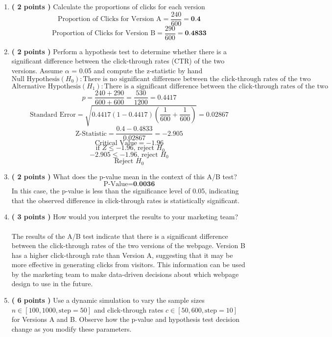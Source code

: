 \documentclass[a3paper,12pt]{extarticle} %
\begin{document}
    \begin{enumerate}
        \item \textbf{( 2 points )} Calculate the proportions of clicks for each version 
        \[
        \text{Proportion of Clicks for Version A} = \frac{240}{600} = \textbf{0.4}
        \]
        \[
        \text{Proportion of Clicks for Version B} = \frac{290}{600} = \textbf{0.4833}
        \]
        \item \textbf{( 2 points )} Perform a hypothesis test to determine whether there is a significant difference between the click-through rates (CTR) of the two versions. Assume \(\alpha\) = 0.05 and compute the z-statistic
        by hand
        \[
        \text{Null Hypothesis} (H_0): \text{There is no significant difference between the click-through rates of the two versions}
        \]
        \[
        \text{Alternative Hypothesis} (H_1): \text{There is a significant difference between the click-through rates of the two versions}
        \]
        \[
        p = \frac{240 + 290}{600 + 600} = \frac{530}{1200} = 0.4417
        \]
        \[
        \text{Standard Error} = \sqrt{0.4417(1-0.4417)(\frac{1}{600} + \frac{1}{600})} = 0.02867
        \]
        \[
        \text{Z-Statistic} = \frac{0.4 - 0.4833}{0.02867} = -2.905
        \]
        \[
        \text{Critical Value} = -1.96
        \]
        \[
        \text{ if } Z \leq -1.96 \text{, reject } H_0
        \]
        \[
         -2.905 \leq -1.96 \text{, reject } H_0
        \]
        \[
        \text{Reject } H_0
        \]
        \item \textbf{( 2 points )} What does the p-value mean in the context of this A/B test?
        \[
        \text{P-Value} = \textbf{0.0036}
        \]
        In this case, the p-value is less than the significance level of 0.05, indicating that the observed difference in click-through rates is statistically significant.
        \item \textbf{( 3 points )} How would you interpret the results to your marketing team?
        \\\\ The results of the A/B test indicate that there is a significant difference between the click-through rates of the two versions of the webpage. Version B has a higher click-through rate than Version A, suggesting that it may be more effective in generating clicks from visitors. This information can be used by the marketing team to make data-driven decisions about which webpage design to use in the future.
        \item \textbf{( 6 points )} Use a dynamic simulation to vary the sample sizes \(n \in [100, 1000, \text{step}=50]\) and click-through rates \(c \in [50, 600, \text{step}=10]\) for Versions A and B. Observe how the p-value and hypothesis test decision change as you modify these parameters.
    \end{enumerate}
\end{document}
